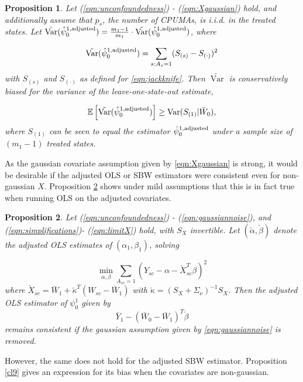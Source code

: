 \documentclass[aoas]{imsart}
\theoremstyle{plain}
\newtheorem{proposition}{Proposition}
\theoremstyle{remark}
\begin{document}
\begin{appendix}
\begin{proposition}\label{prop:jackknife}
Let (\ref{eqn:unconfoundedness}) - (\ref{eqn:Xgaussian}) hold, and additionally assume that $p_s$, the number of CPUMAs, is i.i.d. in the treated states. Let $\hat{\operatorname{Var}}(\hat{\psi}_0^{1, \textup{adjusted}}) = \frac{m_1-1}{m_1} \cdot \tilde{\operatorname{Var}}(\hat{\psi}_0^{1, \textup{adjusted}})$, where

\begin{equation} \label{eqn:prop.jackknife}
\tilde{\operatorname{Var}}(\hat{\psi}_0^{1, \textup{adjusted}}) = \sum_{s:A_{s}=1} (S_{(s)} - S_{(\cdot)})^2
\end{equation}
with $S_{(s)}$ and $S_{(\cdot)}$ as defined for \eqref{eqn:jackknife}. Then $\tilde{\operatorname{Var}}$ is conservatively biased for the variance of the leave-one-state-out estimate,

\[ \mathbb{E}\left[ \tilde{\operatorname{Var}}(\hat{\psi}_0^{1, \textup{adjusted}})\right] \geq \operatorname{Var}(S_{(1)} | \bar{W}_0),\]
where $S_{(1)}$ can be seen to equal the estimator $\hat{\psi}_0^{1,\textup{adjusted}}$ under a sample size of $(m_1-1)$ treated states.

\end{proposition}

As the gaussian covariate assumption given by \eqref{eqn:Xgaussian} is strong, it would be desirable if the adjusted OLS or SBW estimators were consistent even for non-gaussian $X$. Proposition \ref{cl8} shows under mild assumptions that this is in fact true when running OLS on the adjusted covariates. 

\begin{proposition}\label{cl8}
Let (\ref{eqn:unconfoundedness}) - (\ref{eqn:gaussiannoise}), and (\ref{eqn:simplifications})- (\ref{eqn:limitX}) hold, with $S_X$ invertible. Let $(\check{\alpha}, \check{\beta})$ denote the adjusted OLS estimates of $(\alpha_1, \beta_1)$, solving

\[ \min_{\alpha,\beta} \sum_{A_{sc}=1} (Y_{sc} - \alpha - \check{X}_{sc}^T \beta)^2 \]
where $\check{X}_{sc} = \bar{W}_1 + \check{\kappa}^T(W_{sc} - \bar{W}_1)$ with $\check{\kappa} = (S_X + \Sigma_\nu)^{-1}S_X$. Then the adjusted OLS estimator of $\psi_0^1$ given by
\[ \bar{Y}_1 - (\bar{W}_0 - \bar{W}_1)^T \check{\beta}\]
remains consistent if the gaussian assumption given by \eqref{eqn:gaussiannoise} is removed.
\end{proposition}

However, the same does not hold for the adjusted SBW estimator. Proposition \ref{cl9} gives an expression for its bias when the covariates are non-gaussian. 


\end{appendix}
\end{document}

